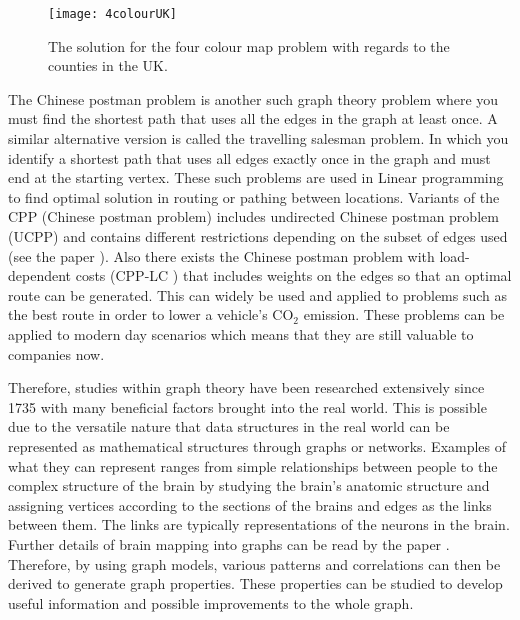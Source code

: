 \begin{figure}[!htb]
\centering
\texttt{[image: 4colourUK]}
\caption{The solution for the four colour map problem with regards to the counties in the UK.}
\label{fig:UK 4 colour}
\end{figure}

The Chinese postman problem is another such graph theory problem where you must find the shortest path that uses all the edges in the graph at least once. A similar alternative version is called the travelling salesman problem. In which you identify a shortest path that uses all edges exactly once in the graph and must end at the starting vertex. These such problems are used in Linear programming to find optimal solution in routing or pathing between locations. Variants of the CPP (Chinese postman problem) includes undirected Chinese postman problem (UCPP) and contains different restrictions depending on the subset of edges used (see the paper \cite{IrnichStefan2008Uppw}). Also there exists the Chinese postman problem with load-dependent costs (CPP-LC \cite{CorberánÁngel2018TCPP}) that includes weights on the edges so that an optimal route can be generated. This can widely be used and applied to problems such as the best route in order to lower a vehicle's CO$_2$ emission. These problems can be applied to modern day scenarios which means that they are still valuable to companies now.
\newline

Therefore, studies within graph theory have been researched extensively since 1735 with many beneficial factors brought into the real world. This is possible due to the versatile nature that data structures in the real world can be represented as mathematical structures through graphs or networks. Examples of what they can represent ranges from simple relationships between people to the complex structure of the brain by studying the brain's anatomic structure and assigning vertices according to the sections of the brains and edges as the links between them. The links are typically representations of the neurons in the brain. Further details of brain mapping into graphs can be read by the paper \cite{articlebrain}. Therefore, by using graph models, various patterns and correlations can then be derived to generate graph properties. These properties can be studied to develop useful information and possible improvements to the whole graph.

